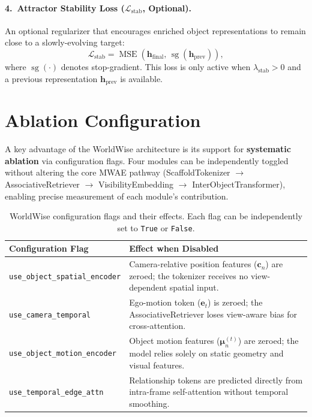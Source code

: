 \documentclass{article}
\newcommand{\op}[1]{\operatorname{#1}}
\newcommand{\mat}[1]{\bm{#1}}
\begin{document}
\paragraph{4.\ Attractor Stability Loss ($\mathcal{L}_{\text{stab}}$, Optional).}  An optional regularizer that encourages enriched object representations to remain close to a slowly-evolving target:
\begin{equation}
    \mathcal{L}_{\text{stab}} = \op{MSE}(\mat{h}_{\text{final}},\, \op{sg}(\mat{h}_{\text{prev}})),
    \label{eq:stability_loss}
\end{equation}
where $\op{sg}(\cdot)$ denotes stop-gradient.  This loss is only active when $\lambda_{\text{stab}} > 0$ and a previous representation $\mat{h}_{\text{prev}}$ is available.

\section{Ablation Configuration}
\label{sec:ablation}

A key advantage of the WorldWise architecture is its support for \textbf{systematic ablation} via configuration flags.  Four modules can be independently toggled without altering the core MWAE pathway (ScaffoldTokenizer $\to$ AssociativeRetriever $\to$ VisibilityEmbedding $\to$ InterObjectTransformer), enabling precise measurement of each module's contribution.

\begin{table}[h]
\centering
\caption{WorldWise configuration flags and their effects.  Each flag can be independently set to \texttt{True} or \texttt{False}.}
\label{tab:ablation_flags}
\begin{tabular}{@{}lp{6.5cm}@{}}
\toprule
\textbf{Configuration Flag} & \textbf{Effect when Disabled} \\
\midrule
\texttt{use\_object\_spatial\_encoder} & Camera-relative position features ($\mat{c}_n$) are zeroed; the tokenizer receives no view-dependent spatial input. \\
\texttt{use\_camera\_temporal} & Ego-motion token ($\mat{e}_t$) is zeroed; the AssociativeRetriever loses view-aware bias for cross-attention. \\
\texttt{use\_object\_motion\_encoder} & Object motion features ($\mat{\mu}_n^{(t)}$) are zeroed; the model relies solely on static geometry and visual features. \\
\texttt{use\_temporal\_edge\_attn} & Relationship tokens are predicted directly from intra-frame self-attention without temporal smoothing. \\
\bottomrule
\end{tabular}
\end{table}
\end{document}
